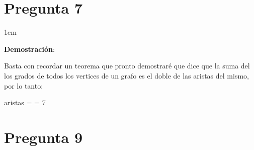 \documentclass[12pt, fleqn]{article}                            %
\newenvironment{SmallIndentation}[1][0.75em]                    %
        {\begin{adjustwidth}{#1}{}\begin{footnotesize}}             %
        {\end{footnotesize}\end{adjustwidth}}                       %
\def \Eq {equation}                                             %
\newenvironment{MultiLineEquation*}[1]                          %
        {\begin{\Eq*}\begin{alignedat}{#1}}                         %
        {\end{alignedat}\end{\Eq*}}                                 %
\theoremstyle{break}                                            %
\begin{document}
    \section{Pregunta 7}

        \begin{SmallIndentation}[1em]
            \textbf{Demostración}:
        
            Basta con recordar un teorema que pronto demostraré que dice que la suma del los grados de todos los vertices
            de un grafo es el doble de las aristas del mismo, por lo tanto:

            \begin{MultiLineEquation*}{3}
                aristas =  = 7
            \end{MultiLineEquation*}
        
        \end{SmallIndentation}


    \clearpage
    \section{Pregunta 9}
\end{document}
